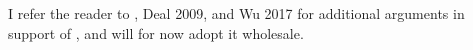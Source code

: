 \documentclass[11pt, letterpaper]{paper_nick}
\begin{document}
I refer the reader to \citealt{richards05}, Deal 2009, and Wu 2017 for additional arguments in support of \Last, and will for now adopt it wholesale. 
\begin{comment}
In addition to capturing the absence of transitive-expletive constructions in English-type languages, I review two additional arguments from the literature supporting \Last. The first, due to Deal (2009), is that expletive insertion is blocked in English for those unaccusatives that denote a ``change of state'' (COS). Such COS predicates, Deal shows, involve a covert, external event-argument in Spec($v$P), thus exhausting this position and ruling out expletive insertion.
\ex. \a. *There melted/disappeared/evaporated some ice cream.
\b. There arrived/departed/came three men.
 
The second argument is due to due to \citet{wu17}, and is is based on Hartman's analysis of \SC{MaxElide} effects (\citealt{hartman11}). Hartman argues, following \citet{takahashi05}, that ellipsis parallelism is sensitive to the presence of unbound variables, so that, roughly speaking, an XP cannot serve as the antecedent for ellipsis if it has an unbound variable. Assuming that movement traces are variables bound by $\lambda$-abstraction at the level of the sister of the moved phrase, it follows that if the antecedent for ellipsis contains a movement trace, it must extend to contain the sister of the moved phrase. 

Hartman shows that this framework correctly predicts the impossibility of VP-ellipsis in instances of object \emph{wh}-movement, where only TP-ellipsis (sluicing) is possible.  
\ex.\label{no-elip} \a. John ate something but I don't know what (*he did)
\b. Sue borrowed a book. Guess which book (*he did)


\end{comment}
\end{document}
